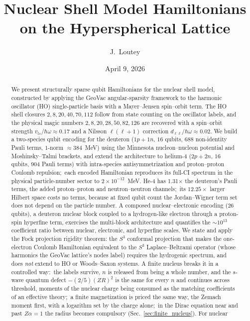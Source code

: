\documentclass[twocolumn,prc,amsmath,amssymb,superscriptaddress]{revtex4-2}
\newcommand{\gvq}[2]{#2}
\begin{document}
\title{Nuclear Shell Model Hamiltonians on the Hyperspherical Lattice}

\author{J.~Loutey}

\date{April 9, 2026}

\begin{abstract}
We present structurally sparse qubit Hamiltonians for the nuclear shell
model, constructed by applying the GeoVac angular-sparsity framework to
the harmonic oscillator (HO) single-particle basis with a Mayer--Jensen
spin--orbit term. The HO shell closures $2, 8, 20, 40, 70, 112$ follow
from state counting on the oscillator labels, and the physical magic numbers
$2, 8, 20, 28, 50, 82, 126$ are recovered with a spin--orbit strength
$v_{ls}/\hbar\omega \approx 0.17$ and a Nilsson $\ell(\ell+1)$ correction
$d_{\ell\ell}/\hbar\omega \approx 0.02$. We build a two-species
qubit encoding for the deuteron ($1p+1n$, $16$ qubits, \gvq{p23_deuteron_pauli}{688} non-identity
Pauli terms, $1$-norm $\approx 384$~MeV) using the Minnesota
nucleon--nucleon potential and Moshinsky--Talmi brackets, and extend the
architecture to helium-4 ($2p+2n$, $16$ qubits, \gvq{p23_he4_pauli}{904} Pauli terms) with
intra-species antisymmetrization and proton--proton Coulomb repulsion;\
each encoded Hamiltonian reproduces its full-CI spectrum in the physical
particle-number sector to $2\times 10^{-12}$~MeV.
He-4 has \gvq{p23_he4_deuteron_pauli_ratio}{1.31}$\times$ the deuteron's Pauli terms, the added
proton--proton and neutron--neutron channels;\ its $12.25\times$ larger
Hilbert space costs no terms, because at fixed qubit count the
Jordan--Wigner term set does not depend on the particle number.
A composed nuclear--electronic encoding ($26$ qubits), a deuteron
nuclear block coupled to a hydrogen-like electron through a proton-spin
hyperfine term, exercises the multi-block architecture and quantifies the
$\sim 10^{13}$ coefficient ratio between nuclear, electronic, and
hyperfine scales. We state and apply the Fock projection rigidity
theorem: the $S^3$ conformal projection that makes the one-electron
Coulomb Hamiltonian
equivalent to the $S^3$ Laplace--Beltrami operator (whose harmonics the
GeoVac lattice's nodes label) requires the hydrogenic spectrum, and
does \emph{not} extend to HO or Woods--Saxon systems. A finite nucleus breaks it in a controlled way:\ the labels survive, $n$ is released from being a whole number, and the $s$-wave quantum defect $-(2/5)(ZR)^2$ is the same for every $n$ and continues across threshold, moments of the nuclear charge being consumed as the matching coefficients of an effective theory;\ a finite magnetization is priced the same way, the Zemach moment first, with a logarithm set by the charge alone;\ in the Dirac equation near and past $Z\alpha = 1$ the radius becomes compulsory (Sec.~\ref{sec:finite_nucleus}). For nuclear

\end{abstract}
\end{document}
